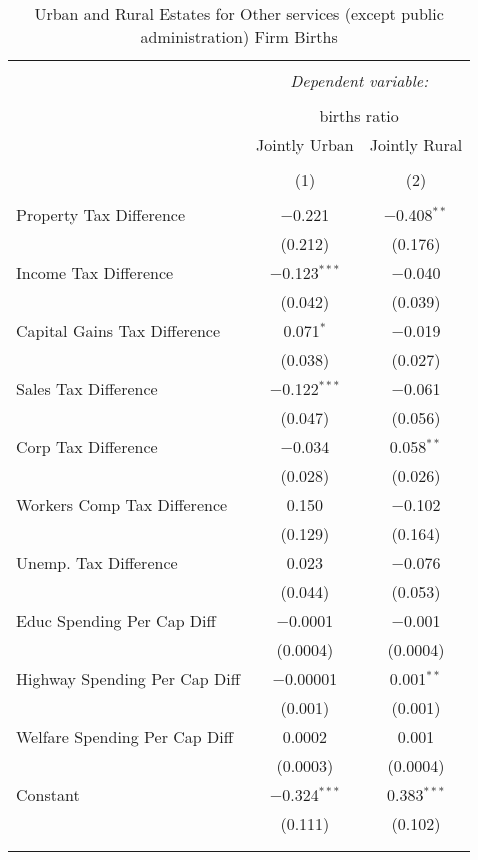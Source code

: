 
\begin{table}[!htbp] \centering 
  \caption{Urban and Rural Estates for  Other services (except public administration) Firm Births} 
  \label{} 
\begin{tabular}{@{\extracolsep{5pt}}lcc} 
\\[-1.8ex]\hline 
\hline \\[-1.8ex] 
 & \multicolumn{2}{c}{\textit{Dependent variable:}} \\ 
\cline{2-3} 
\\[-1.8ex] & \multicolumn{2}{c}{births ratio} \\ 
 & Jointly Urban & Jointly Rural \\ 
\\[-1.8ex] & (1) & (2)\\ 
\hline \\[-1.8ex] 
 Property Tax Difference & $-$0.221 & $-$0.408$^{**}$ \\ 
  & (0.212) & (0.176) \\ 
  Income Tax Difference & $-$0.123$^{***}$ & $-$0.040 \\ 
  & (0.042) & (0.039) \\ 
  Capital Gains Tax Difference & 0.071$^{*}$ & $-$0.019 \\ 
  & (0.038) & (0.027) \\ 
  Sales Tax Difference & $-$0.122$^{***}$ & $-$0.061 \\ 
  & (0.047) & (0.056) \\ 
  Corp Tax Difference & $-$0.034 & 0.058$^{**}$ \\ 
  & (0.028) & (0.026) \\ 
  Workers Comp Tax Difference & 0.150 & $-$0.102 \\ 
  & (0.129) & (0.164) \\ 
  Unemp. Tax Difference & 0.023 & $-$0.076 \\ 
  & (0.044) & (0.053) \\ 
  Educ Spending Per Cap Diff & $-$0.0001 & $-$0.001 \\ 
  & (0.0004) & (0.0004) \\ 
  Highway Spending Per Cap Diff & $-$0.00001 & 0.001$^{**}$ \\ 
  & (0.001) & (0.001) \\ 
  Welfare Spending Per Cap Diff & 0.0002 & 0.001 \\ 
  & (0.0003) & (0.0004) \\ 
  Constant & $-$0.324$^{***}$ & 0.383$^{***}$ \\ 
  & (0.111) & (0.102) \\ 
 \hline \\[-1.8ex] 
\hline 
\hline \\[-1.8ex] 
\end{tabular} 
\end{table} 
